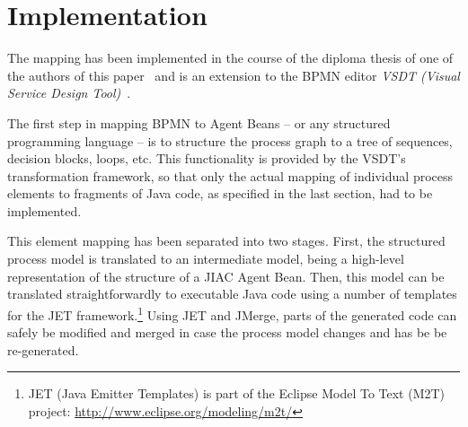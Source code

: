 

\section{Implementation}
\label{sec:impl}

The mapping has been implemented in the course of the diploma thesis of one of
the authors of this paper~\cite{tan2011dipl} and is an extension to the BPMN
editor \emph{VSDT (Visual Service Design Tool)}~\cite{kuester2008vsdt}.

The first step in mapping BPMN to Agent Beans -- or any structured programming
language -- is to structure the process graph to a tree of sequences, decision
blocks, loops, etc.  This functionality is provided by the VSDT's transformation
framework, so that only the actual mapping of individual process elements to
fragments of Java code, as specified in the last section, had to be implemented.

This element mapping has been separated into two stages.  First, the structured
process model is translated to an intermediate model, being a high-level
representation of the structure of a JIAC Agent Bean.  Then, this model can be
translated straightforwardly to executable Java code using a number of templates
for the JET framework.\footnote{JET (Java Emitter Templates) is part of the
Eclipse Model To Text (M2T) project: \url{http://www.eclipse.org/modeling/m2t/}}
Using JET and JMerge, parts of the generated code can safely be modified and
merged in case the process model changes and has be be re-generated.

